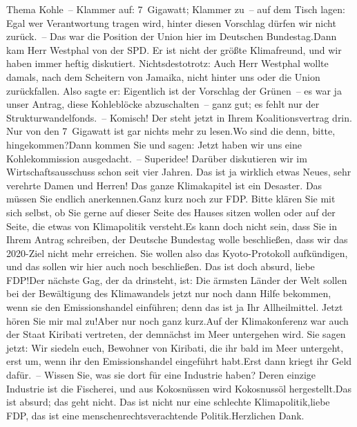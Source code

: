 \documentclass{article}
\begin{document}
Thema Kohle – Klammer auf: 7 Gigawatt; Klammer zu – auf dem Tisch lagen: Egal wer Verantwortung tragen wird, hinter diesen Vorschlag dürfen wir nicht zurück. – Das war die Position der Union hier im Deutschen Bundestag.Dann kam Herr Westphal von der SPD. Er ist nicht der größte Klimafreund, und wir haben immer heftig diskutiert. Nichtsdestotrotz: Auch Herr Westphal wollte damals, nach dem Scheitern von Jamaika, nicht hinter uns oder die Union zurückfallen. Also sagte er: Eigentlich ist der Vorschlag der Grünen – es war ja unser Antrag, diese Kohleblöcke abzuschalten – ganz gut; es fehlt nur der Strukturwandelfonds. – Komisch! Der steht jetzt in Ihrem Koalitionsvertrag drin. Nur von den 7 Gigawatt ist gar nichts mehr zu lesen.Wo sind die denn, bitte, hingekommen?Dann kommen Sie und sagen: Jetzt haben wir uns eine Kohlekommission ausgedacht. – Superidee! Darüber diskutieren wir im Wirtschaftsausschuss schon seit vier Jahren. Das ist ja wirklich etwas Neues, sehr verehrte Damen und Herren! Das ganze Klimakapitel ist ein Desaster. Das müssen Sie endlich anerkennen.Ganz kurz noch zur FDP. Bitte klären Sie mit sich selbst, ob Sie gerne auf dieser Seite des Hauses sitzen wollen oder auf der Seite, die etwas von Klimapolitik versteht.Es kann doch nicht sein, dass Sie in Ihrem Antrag schreiben, der Deutsche Bundestag wolle beschließen, dass wir das 2020-Ziel nicht mehr erreichen. Sie wollen also das Kyoto-Protokoll aufkündigen, und das sollen wir hier auch noch beschließen. Das ist doch absurd, liebe FDP!Der nächste Gag, der da drinsteht, ist: Die ärmsten Länder der Welt sollen bei der Bewältigung des Klimawandels jetzt nur noch dann Hilfe bekommen, wenn sie den Emissionshandel einführen; denn das ist ja Ihr Allheilmittel. Jetzt hören Sie mir mal zu!Aber nur noch ganz kurz.Auf der Klimakonferenz war auch der Staat Kiribati vertreten, der demnächst im Meer untergehen wird. Sie sagen jetzt: Wir siedeln euch, Bewohner von Kiribati, die ihr bald im Meer untergeht, erst um, wenn ihr den Emissionshandel eingeführt habt.Erst dann kriegt ihr Geld dafür. – Wissen Sie, was sie dort für eine Industrie haben? Deren einzige Industrie ist die Fischerei, und aus Kokosnüssen wird Kokosnussöl hergestellt.Das ist absurd; das geht nicht. Das ist nicht nur eine schlechte Klimapolitik,liebe FDP, das ist eine menschenrechtsverachtende Politik.Herzlichen Dank.
\end{document}
